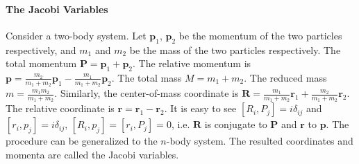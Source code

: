 \documentclass[a4paper,10pt]{article}
\begin{document}
\paragraph{The Jacobi Variables}
Consider a two-body system. Let $\bm p_1$, $\bm p_2$ be the momentum of the two particles respectively, and 
$m_1$ and $m_2$ be the mass of the two particles respectively. 
The total momentum $\bm P = \bm p_1 + \bm p_2$. The relative momentum is $\bm p = \frac{m_2}{m_1+m_2}\bm p_1 - \frac{m_1}{m_1+m_2}\bm p_2$.
The total mass $M = m_1+m_2$. The reduced mass $m = \frac{m_1m_2}{m_1+m_2}$. Similarly, the center-of-mass coordinate 
is $\bm R = \frac{m_1}{m_1+m_2}\bm r_1 + \frac{m_2}{m_1+m_2}\bm r_2$. The relative coordinate is $\bm r = \bm r_1-\bm r_2$.
It is easy to see $[R_i, P_j] = i\delta_{ij}$ and $[r_i, p_j] = i\delta_{ij}$, $[R_i, p_j]=[r_i,P_j]=0$, i.e. $\bm R$ is conjugate to $\bm P$ and 
$\bm r$ to $\bm p$. The procedure can be generalized to the $n$-body system. The resulted coordinates and momenta are called the Jacobi 
variables.
\end{document}
